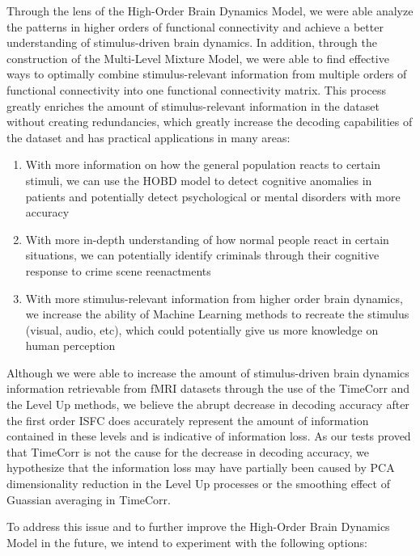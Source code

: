 \documentclass[11pt]{article}
\begin{document}
Through the lens of the High-Order Brain Dynamics Model, we were able analyze the patterns in higher orders of functional connectivity and achieve a better understanding of stimulus-driven brain dynamics. In addition, through the construction of the Multi-Level Mixture Model, we were able to find effective ways to optimally combine stimulus-relevant information from multiple orders of functional connectivity into one functional connectivity matrix. This process greatly enriches the amount of stimulus-relevant information in the dataset without creating redundancies, which greatly increase the decoding capabilities of the dataset and has practical applications in many areas:

\begin{enumerate}
\item With more information on how the general population reacts to certain stimuli, we can use the HOBD model to detect cognitive anomalies in patients and potentially detect psychological or mental disorders with more accuracy
\item With more in-depth understanding of how normal people react in certain situations, we can potentially identify criminals through their cognitive response to crime scene reenactments
\item With more stimulus-relevant information from higher order brain dynamics, we increase the ability of  Machine Learning methods to recreate the stimulus (visual, audio, etc), which could potentially give us more knowledge on human perception
\end{enumerate}

Although we were able to increase the amount of stimulus-driven brain dynamics information retrievable from fMRI datasets through the use of the TimeCorr and the Level Up methods, we believe the abrupt decrease in decoding accuracy after the first order ISFC does accurately represent the amount of information contained in these levels and is indicative of information loss. As our tests proved that TimeCorr is not the cause for the decrease in decoding accuracy, we hypothesize that the information loss may have partially been caused by PCA dimensionality reduction in the Level Up processes or the smoothing effect of Guassian averaging in TimeCorr.

To address this issue and to further improve the High-Order Brain Dynamics Model in the future, we intend to experiment with the following options:
\end{document}

